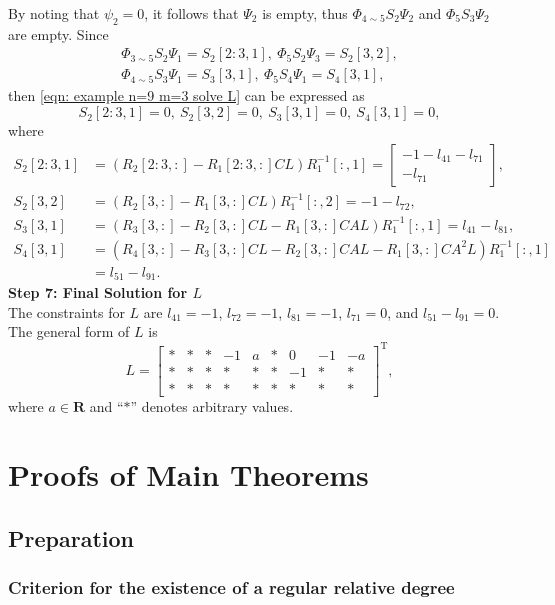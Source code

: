 \documentclass[sort&compress]{elsarticle}
\newcommand\R{\mathbf R}
\newcommand\T{\mathrm T}
\newcommand\PHi{\mathit\Phi}
\newcommand\PSi{\mathit\Psi}
\begin{document}
By noting that $\psi_2=0$,
it follows that $\PSi_2$ is empty,
thus $\PHi_{4\sim5}S_2\PSi_2$ and $\PHi_5S_3\PSi_2$ are empty.
Since
\begin{gather*}
\PHi_{3\sim5}S_2\PSi_1=S_2[2\!:\!3,1],\
\PHi_5S_2\PSi_3=S_2[3,2],
\\
\PHi_{4\sim5}S_3\PSi_1=S_3[3,1],\
\PHi_5S_4\PSi_1=S_4[3,1],
\end{gather*}
then \eqref{eqn: example n=9 m=3 solve L} can be expressed as
\begin{equation*}
S_2[2\!:\!3,1]=0,\ S_2[3,2]=0,\ S_3[3,1]=0,\ S_4[3,1]=0,
\end{equation*}
where
\begin{align*}
S_2[2\!:\!3,1]
&=(
R_2[2\!:\!3,:]-R_1[2\!:\!3,:]CL
)R_1^{-1}[:,1]
=\begin{bmatrix}-1-l_{41}-l_{71}\\ -l_{71}\end{bmatrix},\\
S_2[3,2]
&=(
R_2[3,:]-R_1[3,:]CL
)R_1^{-1}[:,2]
=-1-l_{72},\\
S_3[3,1]
&=(
R_3[3,:]-R_2[3,:]CL-R_1[3,:]CAL
)R_1^{-1}[:,1]
=l_{41}-l_{81},\\
S_4[3,1]
&=(
R_4[3,:]-R_3[3,:]CL-R_2[3,:]CAL-R_1[3,:]CA^2L
)R_1^{-1}[:,1]\\
&=l_{51}-l_{91}.
\end{align*}
\textbf{Step 7: Final Solution for $L$}
\\
The constraints for $L$ are $l_{41}=-1$, $l_{72}=-1$, $l_{81}=-1$, $l_{71}=0$, and $l_{51}-l_{91}=0$.
The general form of $L$ is
\[
L=\begin{bmatrix}
*&*&*&-1&a&*&0&-1&-a\\
*&*&*&*&*&*&-1&*&*\\
*&*&*&*&*&*&*&*&*
\end{bmatrix}^\T,
\]
where $a \in \R$ and ``$*$'' denotes arbitrary values.

\section{Proofs of Main Theorems}

\subsection{Preparation}

\subsubsection{Criterion for the existence of a regular relative degree}
\end{document}
